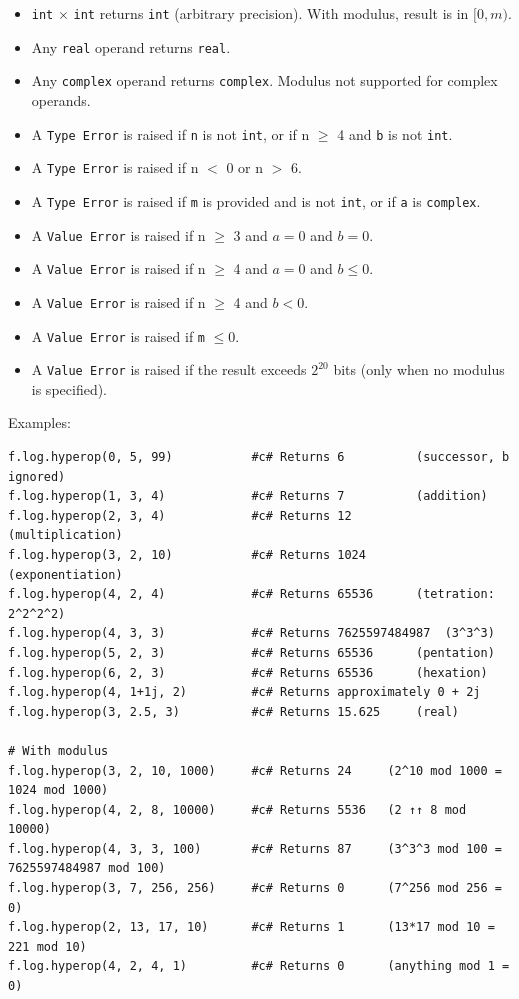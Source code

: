 \begin{itemize}
\item \texttt{int} $\times$ \texttt{int} returns \texttt{int} (arbitrary precision). With modulus, result is in $[0, m)$.
\item Any \texttt{real} operand returns \texttt{real}.
\item Any \texttt{complex} operand returns \texttt{complex}. Modulus not supported for complex operands.
\item A \texttt{Type Error} is raised if \texttt{n} is not \texttt{int}, or if n $\geq$ 4 and \texttt{b} is not \texttt{int}.
\item A \texttt{Type Error} is raised if n $<$ 0 or n $>$ 6.
\item A \texttt{Type Error} is raised if \texttt{m} is provided and is not \texttt{int}, or if \texttt{a} is \texttt{complex}.
\item A \texttt{Value Error} is raised if n $\geq$ 3 and $a = 0$ and $b = 0$.
\item A \texttt{Value Error} is raised if n $\geq$ 4 and $a = 0$ and $b \leq 0$.
\item A \texttt{Value Error} is raised if n $\geq$ 4 and $b < 0$.
\item A \texttt{Value Error} is raised if \texttt{m} $\leq 0$.
\item A \texttt{Value Error} is raised if the result exceeds $2^{20}$ bits (only when no modulus is specified).
\end{itemize}

Examples:
\begin{verbatim}
f.log.hyperop(0, 5, 99)           #c# Returns 6          (successor, b ignored)
f.log.hyperop(1, 3, 4)            #c# Returns 7          (addition)
f.log.hyperop(2, 3, 4)            #c# Returns 12         (multiplication)
f.log.hyperop(3, 2, 10)           #c# Returns 1024       (exponentiation)
f.log.hyperop(4, 2, 4)            #c# Returns 65536      (tetration: 2^2^2^2)
f.log.hyperop(4, 3, 3)            #c# Returns 7625597484987  (3^3^3)
f.log.hyperop(5, 2, 3)            #c# Returns 65536      (pentation)
f.log.hyperop(6, 2, 3)            #c# Returns 65536      (hexation)
f.log.hyperop(4, 1+1j, 2)         #c# Returns approximately 0 + 2j
f.log.hyperop(3, 2.5, 3)          #c# Returns 15.625     (real)

# With modulus
f.log.hyperop(3, 2, 10, 1000)     #c# Returns 24     (2^10 mod 1000 = 1024 mod 1000)
f.log.hyperop(4, 2, 8, 10000)     #c# Returns 5536   (2 ↑↑ 8 mod 10000)
f.log.hyperop(4, 3, 3, 100)       #c# Returns 87     (3^3^3 mod 100 = 7625597484987 mod 100)
f.log.hyperop(3, 7, 256, 256)     #c# Returns 0      (7^256 mod 256 = 0)
f.log.hyperop(2, 13, 17, 10)      #c# Returns 1      (13*17 mod 10 = 221 mod 10)
f.log.hyperop(4, 2, 4, 1)         #c# Returns 0      (anything mod 1 = 0)
\end{verbatim}

